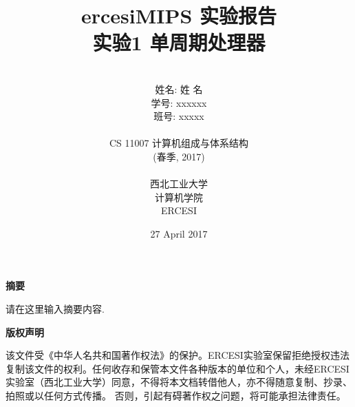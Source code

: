 \documentclass[a4paper]{article}
\begin{document}
\renewcommand{\contentsname}{目\ 录}
\renewcommand{\appendixname}{附录}
\renewcommand{\appendixpagename}{附录}
\renewcommand{\refname}{参考文献} 
\renewcommand{\figurename}{图}
\renewcommand{\tablename}{表}
\title{{\Huge ercesiMIPS 实验报告{\large\linebreak\\}}{\Large 实验1 单周期处理器\linebreak\linebreak}}
\author{\\姓名: 姓 名\\
学号: xxxxxx\\
班号: xxxxx\\\\
CS 11007 计算机组成与体系结构\\
(春季, 2017)\\\\
西北工业大学\\
计算机学院\\
ERCESI}
\date{27 April 2017}
\maketitle
\newpage

\begin{center}
{\large\bf{摘要\\}}
\end{center}
请在这里输入摘要内容.
\newpage
\begin{center}
{\large\bf{版权声明\\}}
\end{center}
该文件受《中华人名共和国著作权法》的保护。ERCESI实验室保留拒绝授权违法复制该文件的权利。任何收存和保管本文件各种版本的单位和个人，未经ERCESI实验室（西北工业大学）同意，不得将本文档转借他人，亦不得随意复制、抄录、拍照或以任何方式传播。 否则，引起有碍著作权之问题，将可能承担法律责任。\newpage
\begin{center}
\tableofcontents\label{c}
\end{center}
\newpage


\end{document}
